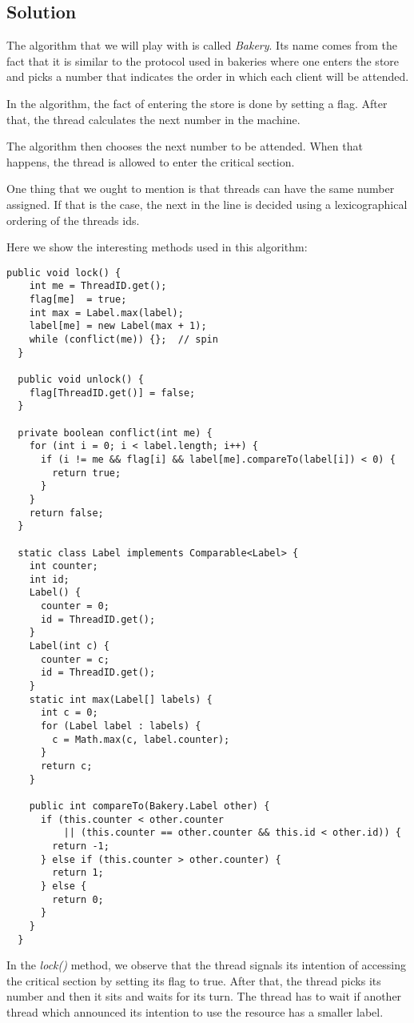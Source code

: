 \subsection{Solution}
\par
The algorithm that we will play with is called \textit{Bakery}. Its name comes from the
fact that it is similar to the protocol used in bakeries where one enters the
store and picks a number that indicates the order in which each client will be
attended. 
\par
In the algorithm, the fact of entering the store is done by setting a flag.
After that, the thread calculates the next number in the machine. 
\par
The algorithm then chooses the next number to be attended. When that happens,
the thread is allowed to enter the critical section.
\par
One thing that we ought to mention is that threads can have the same number
assigned. If that is the case, the next in the line is decided using a
lexicographical ordering of the threads ids.
\par
Here we show the interesting methods used in this algorithm:
\par
\hfill
\begin{lstlisting}[style=numbers]
  public void lock() {
    int me = ThreadID.get();
    flag[me]  = true;
    int max = Label.max(label);
    label[me] = new Label(max + 1);
    while (conflict(me)) {};  // spin
  }

  public void unlock() {
    flag[ThreadID.get()] = false;
  }
  
  private boolean conflict(int me) {
    for (int i = 0; i < label.length; i++) {
      if (i != me && flag[i] && label[me].compareTo(label[i]) < 0) {
        return true;
      }
    }
    return false;
  }

  static class Label implements Comparable<Label> {
    int counter;
    int id;
    Label() {
      counter = 0;
      id = ThreadID.get();
    }
    Label(int c) {
      counter = c;
      id = ThreadID.get();
    }
    static int max(Label[] labels) {
      int c = 0;
      for (Label label : labels) {
        c = Math.max(c, label.counter);
      }
      return c;
    }
    
    public int compareTo(Bakery.Label other) {
      if (this.counter < other.counter
          || (this.counter == other.counter && this.id < other.id)) {
        return -1;
      } else if (this.counter > other.counter) {
        return 1;
      } else {
        return 0;
      }
    }
  }
\end{lstlisting}
\hfill
\par
In the \textit{lock()} method, we observe that the thread signals its intention
of accessing the critical section by setting its flag to true. After that, the
thread picks its number and then it sits and waits for its turn. The thread has
to wait if another thread which announced its intention to use the resource has
a smaller label. 
\par
